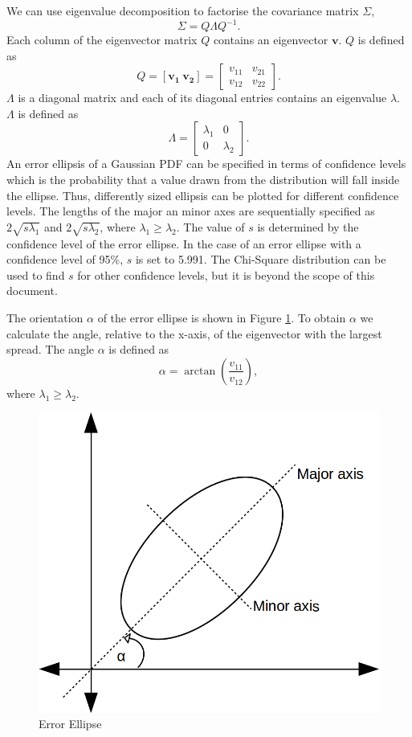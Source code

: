 \documentclass[12pt,oneside,openany,a4paper, %
afrikaans,english,
]{memoir}
\numberwithin{equation}{chapter}
\begin{document}
We can use eigenvalue decomposition to factorise the covariance matrix $\Sigma$,
\begin{equation}
\Sigma = Q\Lambda Q^{-1}.
\end{equation}
Each column of the eigenvector matrix $Q$ contains an eigenvector $\bm{v}$. $Q$ is defined as
\begin{equation}
Q =
[\bm{v_1} \ \bm{v_2}]
=
\begin{bmatrix}
v_{11} & v_{21}\\
v_{12} & v_{22}
\end{bmatrix}.
\end{equation}
$\Lambda$ is a diagonal matrix and each of its diagonal entries contains an eigenvalue $\lambda$. $\Lambda$ is defined as 
\begin{equation}
\Lambda =
\begin{bmatrix}
\lambda_1 & 0\\
0 & \lambda_2
\end{bmatrix}.
\end{equation}
An error ellipsis of a Gaussian PDF can be specified in terms of confidence levels which is the probability that a value drawn from the distribution will fall inside the ellipse. Thus, differently sized ellipsis can be plotted for different confidence levels. The lengths of the major an minor axes are sequentially specified as $2\sqrt{s\lambda_1}$ and $2\sqrt{s\lambda_2}$, where $\lambda_1 \geq \lambda_2$. The value of $s$ is determined by the confidence level of the error ellipse. In the case of an error ellipse with a confidence level of 95\%, $s$ is set to 5.991. The Chi-Square distribution can be used to find $s$ for other confidence levels, but it is beyond the scope of this document.

The orientation $\alpha$ of the error ellipse is shown in Figure \ref{fig:e_ellipse}. To obtain $\alpha$ we calculate the angle, relative to the x-axis, of the eigenvector with the largest spread. The angle $\alpha$ is defined as
\begin{equation}
\alpha = \arctan\left(\frac{v_{11}}{v_{12}}\right),
\end{equation}
where $\lambda_1 \geq \lambda_2$.

\begin{figure}[H]
  \includegraphics[width=0.5\linewidth]{Figures/e_ellipse.png}
  \centering
  \caption{Error Ellipse}
  \label{fig:e_ellipse}
\end{figure}
\end{document}
